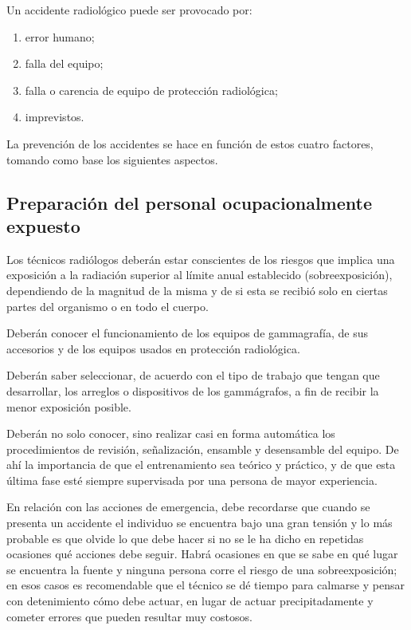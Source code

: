 Un accidente radiológico puede ser provocado por:
\begin{enumerate}[label=\alph*)]
  \item error humano;
  \item falla del equipo;
  \item falla o carencia de equipo de protección radiológica;
  \item imprevistos.
\end{enumerate}

La prevención de los accidentes se hace en función de estos cuatro factores, tomando como base los siguientes aspectos.

\subsection{Preparación del personal ocupacionalmente expuesto}

Los técnicos radiólogos deberán estar conscientes de los riesgos que implica una exposición a la radiación superior al límite anual establecido (sobreexposición), dependiendo de la magnitud de la misma y de si esta se recibió solo en ciertas partes del organismo o en todo el cuerpo.

Deberán conocer el funcionamiento de los equipos de gammagrafía, de sus accesorios y de los equipos usados en protección radiológica.

Deberán saber seleccionar, de acuerdo con el tipo de trabajo que tengan que desarrollar, los arreglos o dispositivos de los gammágrafos, a fin de recibir la menor exposición posible.

Deberán no solo conocer, sino realizar casi en forma automática los procedimientos de revisión, señalización, ensamble y desensamble del equipo. De ahí la importancia de que el entrenamiento sea teórico y práctico, y de que esta última fase esté siempre supervisada por una persona de mayor experiencia.

En relación con las acciones de emergencia, debe recordarse que cuando se presenta un accidente el individuo se encuentra bajo una gran tensión y lo más probable es que olvide lo que debe hacer si no se le ha dicho en repetidas ocasiones qué acciones debe seguir. Habrá ocasiones en que se sabe en qué lugar se encuentra la fuente y ninguna persona corre el riesgo de una sobreexposición; en esos casos es recomendable que el técnico se dé tiempo para calmarse y pensar con detenimiento cómo debe actuar, en lugar de actuar precipitadamente y cometer errores que pueden resultar muy costosos.

